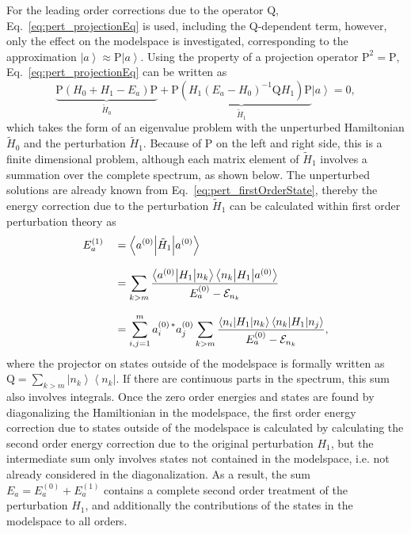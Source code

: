 For the leading order corrections due to the operator $\text{Q}$, Eq.~\eqref{eq:pert_projectionEq} is used, including the Q-dependent term, however, only the effect on the modelspace is investigated, corresponding to the approximation $\left|a\right> \approx \text{P}\left|a\right>$. Using the property of a projection operator $\text{P}^2=\text{P}$, Eq.~\eqref{eq:pert_projectionEq} can be written as
\begin{equation}
\label{eq:pert_secondOrder}
 \underbrace{\text{P}(H_0+H_1-E_a)\text{P}}_{\tilde{H}_0} + \underbrace{\text{P}(H_1(E_a-H_0)^{-1}\text{Q}H_1)\text{P}}_{\tilde{H}_1} \left|a\right> = 0,
\end{equation}
which takes the form of an eigenvalue problem with the unperturbed Hamiltonian $\tilde{H}_0$ and the perturbation $\tilde{H}_1$. Because of $\text{P}$ on the left and right side, this is a finite dimensional problem, although each matrix element of $\tilde{H}_1$ involves a summation over the complete spectrum, as shown below. The unperturbed solutions are already known from Eq.~\eqref{eq:pert_firstOrderState}, thereby the energy correction due to the perturbation $\tilde{H}_1$ can be calculated within first order perturbation theory as
\begin{alignat}{2}
\label{eq:pert_secondOrderEnerg}
&E_a^{(1)}&&= \left<a^{(0)} \middle| \tilde{H}_1 \middle| a^{(0)} \right>\\[7.5pt]
& &&= \sum_{k>m} \frac{\left<a^{(0)}\middle|H_1\middle|n_k\right>\left<n_k\middle|H_1\middle|a^{(0)}\right>}{E_a^{(0)}-\mathcal{E}_{n_k}}\\[7.5pt]
& &&= \sum_{i,j=1}^m a_i^{(0)\,*}a_j^{(0)} \sum_{k>m} \frac{\left<n_i\middle|H_1\middle|n_k\right>\left<n_k\middle|H_1\middle|n_j\right>}{E_a^{(0)}-\mathcal{E}_{n_k}}\notag,
\end{alignat}
where the projector on states outside of the modelspace is formally written as $\text{Q}=\sum_{k>m}\left|n_k\right>\left<n_k\right|$. If there are continuous parts in the spectrum, this sum also involves integrals. Once the zero order energies and states are found by diagonalizing the Hamiltionian in the modelspace, the first order energy correction due to states outside of the modelspace is calculated by calculating the second order energy correction due to the original perturbation $H_1$, but the intermediate sum only involves states not contained in the modelspace, i.e. not already considered in the diagonalization. As a result, the sum $E_a = E_a^{(0)}+E_a^{(1)}$ contains a complete second order treatment of the perturbation $H_1$, and additionally the contributions of the states in the modelspace to all orders.

